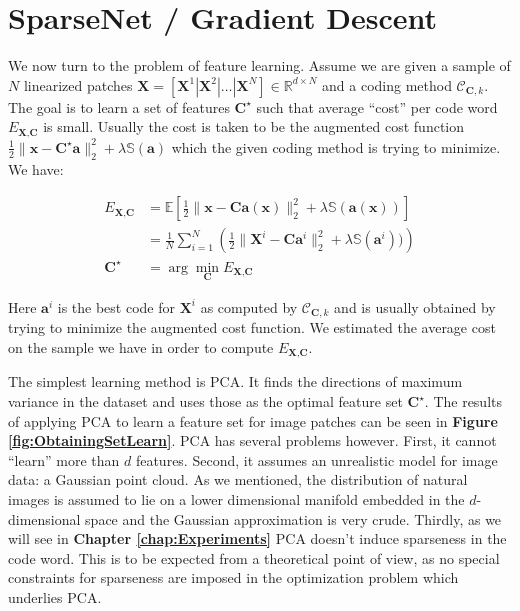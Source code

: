 \documentclass[12pt,a4paper,oneside,english]{UPBThesis}
\newcommand{\hctimes}[2]{{#1}\!\times\!{#2}}
\begin{document}
\section{SparseNet / Gradient Descent}
\label{sec:SparseNetGradientDescent}

We now turn to the problem of feature learning. Assume we are given a sample of $N$ linearized patches $\textbf{X} = \left[ \textbf{X}^1 \left|\right. \textbf{X}^2 \left|\right. \dots \left|\right. \textbf{X}^N \right] \in \mathbb{R}^{\hctimes{d}{N}}$ and a coding method $\mathcal{C}_{\textbf{C},k}$. The goal is to learn a set of features $\textbf{C}^\star$ such that average ``cost'' per code word $E_{\textbf{X},\textbf{C}}$ is small. Usually the cost is taken to be the augmented cost function $\frac{1}{2} \| \textbf{x} - \textbf{C}^\star\textbf{a} \|_2^2 + \lambda \mathbb{S}(\textbf{a})$ which the given coding method is trying to minimize. We have:

\begin{align*}
E_{\textbf{X},\textbf{C}} & = \mathbb{E} [ \frac{1}{2} \| \textbf{x} - \textbf{C}\textbf{a}(\textbf{x}) \|_2^2 + \lambda\mathbb{S}(\textbf{a}(\textbf{x}))] \\
& = \frac{1}{N} \sum_{i=1}^N{\left( \frac{1}{2} \| \textbf{X}^i - \textbf{C}\textbf{a}^i \|_2^2 + \lambda\mathbb{S}(\textbf{a}^i)) \right)} \\
\textbf{C}^\star & = \arg\min_\textbf{C} E_{\textbf{X},\textbf{C}}
\end{align*}

Here $\textbf{a}^i$ is the best code for $\textbf{X}^i$ as computed by $\mathcal{C}_{\textbf{C},k}$ and is usually obtained by trying to minimize the augmented cost function. We estimated the average cost on the sample we have in order to compute $E_{\textbf{X},\textbf{C}}$.

The simplest learning method is PCA. It finds the directions of maximum variance in the dataset and uses those as the optimal feature set $\textbf{C}^\star$. The results of applying PCA to learn a feature set for image patches can be seen in \textbf{Figure \ref{fig:ObtainingSetLearn}}. PCA has several problems however. First, it cannot ``learn'' more than $d$ features. Second, it assumes an unrealistic model for image data: a Gaussian point cloud. As we mentioned, the distribution of natural images is assumed to lie on a lower dimensional manifold embedded in the $d$-dimensional space and the Gaussian approximation is very crude. Thirdly, as we will see in \textbf{Chapter \ref{chap:Experiments}} PCA doesn't induce sparseness in the code word. This is to be expected from a theoretical point of view, as no special constraints for sparseness are imposed in the optimization problem which underlies PCA.
\end{document}
